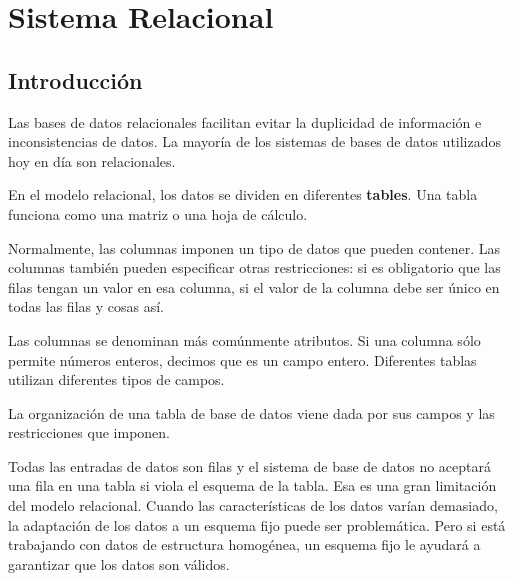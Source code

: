 \documentclass[12pt, fleqn]{report}                             %
\begin{document}
    \chapter{Sistema Relacional}



        \clearpage
        \section{Introducción}

        Las bases de datos relacionales facilitan evitar la duplicidad de información
        e inconsistencias de datos.
        La mayoría de los sistemas de bases de datos utilizados hoy en día son relacionales.

        En el modelo relacional, los datos se dividen en diferentes \textbf{tables}.
        Una tabla funciona como una matriz o una hoja de cálculo.

        Normalmente, las columnas imponen un tipo de datos que pueden contener.
        Las columnas también pueden especificar otras restricciones: si es obligatorio que las
        filas tengan un valor en esa columna, si el valor de la columna debe ser único en todas
        las filas y cosas así.

        Las columnas se denominan más comúnmente atributos.
        Si una columna sólo permite números enteros, decimos que es un campo entero.
        Diferentes tablas utilizan diferentes tipos de campos.

        La organización de una tabla de base de datos viene dada por sus campos y las
        restricciones que imponen.

        Todas las entradas de datos son filas y el sistema de base de datos no aceptará
        una fila en una tabla si viola el esquema de la tabla. Esa es una gran limitación
        del modelo relacional.
        Cuando las características de los datos varían demasiado, la adaptación de los datos
        a un esquema fijo puede ser problemática. Pero si está trabajando con datos de
        estructura homogénea, un esquema fijo le ayudará a garantizar que los datos son válidos.
\end{document}
